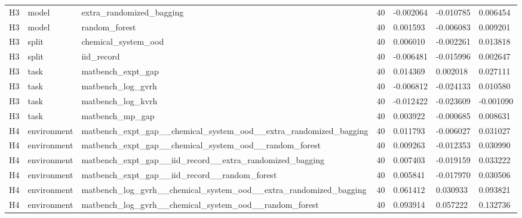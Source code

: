 \documentclass[10pt]{article}
\begin{document}
\begin{landscape}
\begin{longtable}{L{.35in}L{.6in}L{3.55in}L{.4in}L{.88in}L{.88in}L{.88in}}
H3 & model & extra\_\allowbreak{}randomized\_\allowbreak{}bagging & 40 & -0.002064 & -0.010785 & 0.006454\\
H3 & model & random\_\allowbreak{}forest & 40 & 0.001593 & -0.006083 & 0.009201\\
H3 & split & chemical\_\allowbreak{}system\_\allowbreak{}ood & 40 & 0.006010 & -0.002261 & 0.013818\\
H3 & split & iid\_\allowbreak{}record & 40 & -0.006481 & -0.015996 & 0.002647\\
H3 & task & matbench\_\allowbreak{}expt\_\allowbreak{}gap & 40 & 0.014369 & 0.002018 & 0.027111\\
H3 & task & matbench\_\allowbreak{}log\_\allowbreak{}gvrh & 40 & -0.006812 & -0.024133 & 0.010580\\
H3 & task & matbench\_\allowbreak{}log\_\allowbreak{}kvrh & 40 & -0.012422 & -0.023609 & -0.001090\\
H3 & task & matbench\_\allowbreak{}mp\_\allowbreak{}gap & 40 & 0.003922 & -0.000685 & 0.008631\\
H4 & environment & matbench\_\allowbreak{}expt\_\allowbreak{}gap\_\allowbreak{}\_\allowbreak{}chemical\_\allowbreak{}system\_\allowbreak{}ood\_\allowbreak{}\_\allowbreak{}extra\_\allowbreak{}randomized\_\allowbreak{}bagging & 40 & 0.011793 & -0.006027 & 0.031027\\
H4 & environment & matbench\_\allowbreak{}expt\_\allowbreak{}gap\_\allowbreak{}\_\allowbreak{}chemical\_\allowbreak{}system\_\allowbreak{}ood\_\allowbreak{}\_\allowbreak{}random\_\allowbreak{}forest & 40 & 0.009263 & -0.012353 & 0.030990\\
H4 & environment & matbench\_\allowbreak{}expt\_\allowbreak{}gap\_\allowbreak{}\_\allowbreak{}iid\_\allowbreak{}record\_\allowbreak{}\_\allowbreak{}extra\_\allowbreak{}randomized\_\allowbreak{}bagging & 40 & 0.007403 & -0.019159 & 0.033222\\
H4 & environment & matbench\_\allowbreak{}expt\_\allowbreak{}gap\_\allowbreak{}\_\allowbreak{}iid\_\allowbreak{}record\_\allowbreak{}\_\allowbreak{}random\_\allowbreak{}forest & 40 & 0.005841 & -0.017970 & 0.030506\\
H4 & environment & matbench\_\allowbreak{}log\_\allowbreak{}gvrh\_\allowbreak{}\_\allowbreak{}chemical\_\allowbreak{}system\_\allowbreak{}ood\_\allowbreak{}\_\allowbreak{}extra\_\allowbreak{}randomized\_\allowbreak{}bagging & 40 & 0.061412 & 0.030933 & 0.093821\\
H4 & environment & matbench\_\allowbreak{}log\_\allowbreak{}gvrh\_\allowbreak{}\_\allowbreak{}chemical\_\allowbreak{}system\_\allowbreak{}ood\_\allowbreak{}\_\allowbreak{}random\_\allowbreak{}forest & 40 & 0.093914 & 0.057222 & 0.132736\\

\end{longtable}
\end{landscape}
\end{document}
